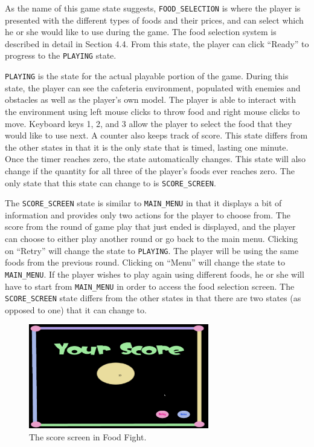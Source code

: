 \documentclass{article}
\begin{document}
As the name of this game state suggests, \verb+FOOD_SELECTION+ is where the player is presented with the different types of foods and their prices, and can select which he or she would like to use during the game. The food selection system is described in detail in Section 4.4. From this state, the player can click ``Ready'' to progress to the \verb+PLAYING+ state.

\verb+PLAYING+ is the state for the actual playable portion of the game. During this state, the player can see the cafeteria environment, populated with enemies and obstacles as well as the player's own model. The player is able to interact with the environment using left mouse clicks to throw food and right mouse clicks to move. Keyboard keys 1, 2, and 3 allow the player to select the food that they would like to use next. A counter also keeps track of score. This state differs from the other states in that it is the only state that is timed, lasting one minute. Once the timer reaches zero, the state automatically changes. This state will also change if the quantity for all three of the player's foods ever reaches zero. The only state that this state can change to is \verb+SCORE_SCREEN+.

The \verb+SCORE_SCREEN+ state is similar to \verb+MAIN_MENU+ in that it displays a bit of information and provides only two actions for the player to choose from. The score from the round of game play that just ended is displayed, and the player can choose to either play another round or go back to the main menu. Clicking on ``Retry'' will change the state to \verb+PLAYING+. The player will be using the same foods from the previous round. Clicking on ``Menu'' will change the state to \verb+MAIN_MENU+. If the player wishes to play again using different foods, he or she will have to start from \verb+MAIN_MENU+ in order to access the food selection screen. The \verb+SCORE_SCREEN+ state differs from the other states in that there are two states (as opposed to one) that it can change to.

\begin{figure}[H]
  \centering
    \includegraphics[width=0.7\textwidth]{scorescreen}
    \caption{The score screen in Food Fight.}    
\end{figure}
\end{document}
